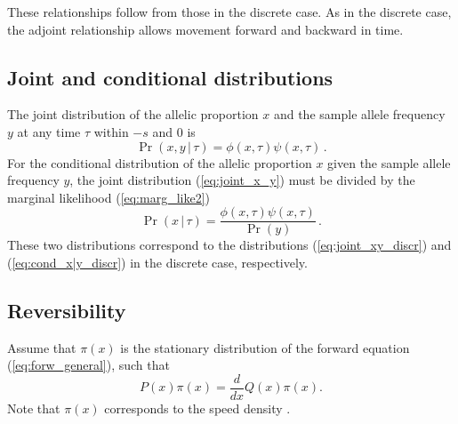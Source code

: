 \documentclass[preprint]{elsarticle}
\newcommand\given{{\,|\,}}
\begin{document}
These relationships follow from those in the discrete case. As in the discrete case, the adjoint relationship allows movement forward and backward in time. 

\subsection{Joint and conditional distributions}

The joint distribution of the allelic proportion $x$ and the sample allele frequency $y$ at any time $\tau$ within $-s$ and $0$ is
\begin{equation}\label{eq:joint_x_y}
\Pr(x,y \given \tau)= \phi(x, \tau)\psi(x,\tau)\,.
\end{equation}
For the conditional distribution of the allelic proportion $x$ given the sample allele frequency $y$, the joint distribution (\ref{eq:joint_x_y}) must be divided by the marginal likelihood (\ref{eq:marg_like2})
\begin{equation}\label{eq:cond_x|y}
\Pr(x\given \tau)= \frac{\phi(x, \tau)\psi(x,\tau)}{\Pr(y)}\,.
\end{equation}
These two distributions correspond to the distributions (\ref{eq:joint_xy_discr}) and (\ref{eq:cond_x|y_discr}) in the discrete case, respectively. 

\subsection{Reversibility}

Assume that $\pi(x)$ is the stationary distribution of the forward equation (\ref{eq:forw_general}), such that 
\begin{equation}
P(x)\pi(x)=\frac{d}{d x}Q(x)\pi(x).
\end{equation}
Note that $\pi(x)$ corresponds to the speed density \citep{Ewen04,Song12}. 
\end{document}
